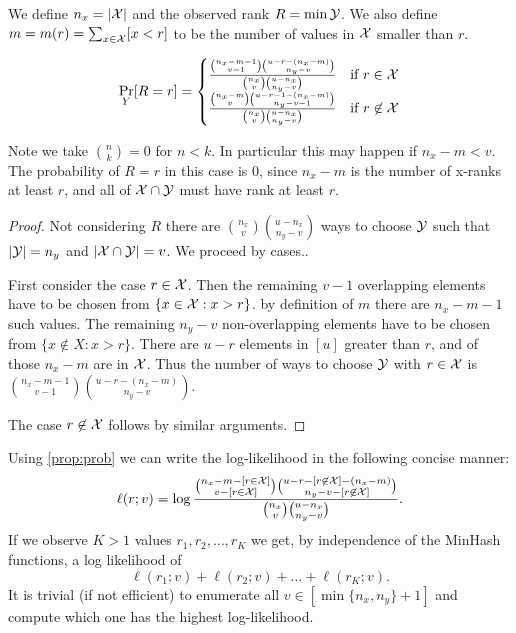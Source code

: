We define $n_x = |\mathcal{X}|$ and the observed rank $R=\min \mathcal{Y}$.
We also define $m=m(r)=\sum_{x\in \mathcal{X}}[x < r]$ to be the number of values in $\mathcal{X}$ smaller than $r$.
\begin{proposition}
\[
   \Pr_Y[R=r]
    =
    \begin{cases}
      \frac{\binom{n_x-m-1}{v-1}\binom{u-r-(n_x-m)}{n_y-v}}{\binom{n_x}{v}\binom{u-n_x}{n_y-v}}
      &
      \text{if $r\in \mathcal{X}$}
       \\
      \frac{\binom{n_x-m}{v}\binom{u-r-1-(n_x-m)}{n_y-v-1}}{\binom{n_x}{v}\binom{u-n_x}{n_y-v}}
      & \text{if $r\not\in \mathcal{X}$}
    \end{cases}
 \]
 \label{prop:prob}
\end{proposition}
%
Note we take $\binom{n}{k}=0$ for $n<k$.
In particular this may happen if $n_x-m<v$.
The probability of $R=r$ in this case is 0, since $n_x-m$ is the number of x-ranks at least $r$, and all of $\mathcal{X}\cap \mathcal{Y}$ must have rank at least $r$.
\begin{proof}
   Not considering $R$ there are $\binom{n_x}{v}\binom{u-n_x}{n_y-v}$ ways to choose $\mathcal{Y}$ such that $|\mathcal{Y}|=n_y$ and $|\mathcal{X}\cap \mathcal{Y}|=v$.
   We proceed by cases..

   First consider the case $r\in \mathcal{X}$.
   Then the remaining $v-1$ overlapping elements have to be chosen from $\{x\in \mathcal{X}:x > r\}$.
   by definition of $m$ there are $n_x-m-1$ such values.
   The remaining $n_y-v$ non-overlapping elements have to be chosen from $\{x\not\in X: x > r \}$.
   There are $u-r$ elements in $[u]$ greater than $r$, and of those $n_x-m$ are in $\mathcal{X}$.
   Thus the number of ways to choose $\mathcal{Y}$ with $r\in \mathcal{X}$ is
   $\binom{n_x-m-1}{v-1}\binom{u-r-(n_x-m)}{n_y-v}$.

   The case $r\not\in \mathcal{X}$ follows by similar arguments.
\end{proof}

Using \cref{prop:prob} we can write the log-likelihood in the following concise manner:
\[
   \ell(r; v) = \log \frac{\binom{n_x-m-[r\in \mathcal{X}]}{v-[r\in \mathcal{X}]}\binom{u-r-[r\not\in \mathcal{X}]-(n_x-m)}{n_y-v-[r\not\in \mathcal{X}]}}{\binom{n_x}{v}\binom{u-n_x}{n_y-v}}.
   \label{eq:log-likelihood}
\]
If we observe $K>1$ values $r_1, r_2, \dots, r_K$ we get, by independence of the MinHash functions, a log likelihood of
\[
   \ell(r_1; v) + \ell(r_2; v) + \dots + \ell(r_K; v).
\]
It is trivial (if not efficient) to enumerate all $v\in[\min\{n_x,n_y\}+1]$ and compute which one has the highest log-likelihood.

